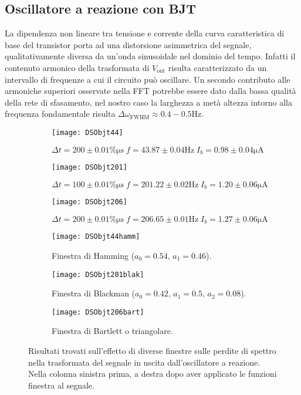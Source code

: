 \documentclass{article}[a4paper, oneside, 11pt]
\begin{document}
\subsection{Oscillatore a reazione con BJT}
La dipendenza non lineare tra tensione e corrente della curva caratteristica
di base del transistor porta ad una distorsione asimmetrica del segnale, 
qualitativamente diversa da un'onda sinusoidale nel dominio del tempo.
Infatti il contenuto armonico della trasformata di $V_{\text{out}}$ risulta
caratterizzato da un intervallo di frequenze a cui il circuito può
oscillare. Un secondo contributo alle armoniche superiori osservate nella
FFT potrebbe essere dato dalla bassa qualità della rete di sfasamento,
nel nostro caso la larghezza a metà altezza intorno alla frequenza
fondamentale risulta $\Delta \omega_{\text{FWHM}} \approx 0.4 - 0.5 \si{\Hz}$. 
\begin{figure}[!htb]
\centering
	\begin{subfigure}{.5\textwidth}
	\texttt{[image: DSObjt44]}
	\caption{$\Delta t = 200 \pm 0.01 \% \si{\us} \; f = 43.87
	\pm 0.04 \si{\Hz} \; I_b = 0.98 \pm 0.04 \si{\uA}$}
	\texttt{[image: DSObjt201]}
	\caption{$\Delta t = 100 \pm 0.01 \% \si{\us} \; f = 201.22
	\pm 0.02 \si{\Hz} \; I_b = 1.20 \pm 0.06 \si{\uA}$}
	\texttt{[image: DSObjt206]}
	\caption{$\Delta t = 200 \pm 0.01 \% \si{\us} \; f = 206.65
	\pm 0.01 \si{\Hz} \; I_b = 1.27 \pm 0.06 \si{\uA}$}
\label{fig: BJTin}
	\end{subfigure}%
	\begin{subfigure}{.5\textwidth}
	\texttt{[image: DSObjt44hamm]}
	\caption{Finestra di Hamming ($a_0 = 0.54, \, a_1 = 0.46$).}
	\texttt{[image: DSObjt201blak]}
	\caption{Finestra di Blackman ($a_0 = 0.42, \, a_1 = 0.5, \, a_2 = 0.08$).}
	\texttt{[image: DSObjt206bart]}
	\caption{Finestra di Bartlett o triangolare.}
\label{fig: BJTwin}
	\end{subfigure}%
	\caption{Risultati trovati sull'effetto di diverse finestre	sulle
			perdite di spettro nella trasformata del segnale in uscita
		 	dall'oscillatore a reazione.
			Nella colonna sinistra prima, a destra dopo aver applicato
			le funzioni finestra al segnale. \label{fig: BJTall}}
\end{figure}
\end{document}
